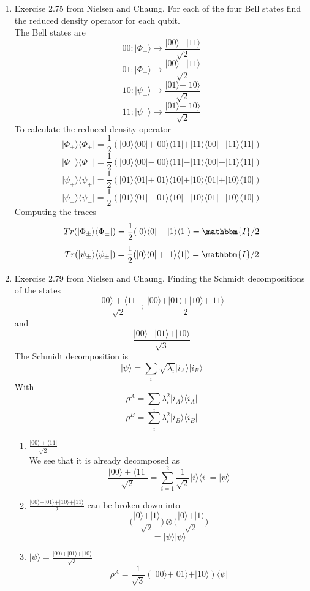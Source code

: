 \documentclass[12pt]{article}
\newcommand{\ket}[1]{\vert{#1}\rangle}
\newcommand{\bra}[1]{\langle{#1}\vert}
\begin{document}
\begin{enumerate}
\item Exercise 2.75 from Nielsen and Chaung. For each of the four Bell states find the reduced density operator for each qubit. 
\\ 
The Bell states are 
$$ 00: \ket{\Phi_+} \rightarrow \frac{\ket{00} + \ket{11}}{\sqrt{2}} $$ 
$$ 01: \ket{\Phi_-} \rightarrow \frac{\ket{00} - \ket{11}}{\sqrt{2}} $$
$$ 10: \ket{\psi_+} \rightarrow \frac{\ket{01} + \ket{10}}{\sqrt{2}} $$
$$ 11: \ket{\psi_-} \rightarrow \frac{\ket{01} - \ket{10}}{\sqrt{2}} $$ 
To calculate the reduced density operator 
$$ \ket{\Phi_+}\bra{\Phi_+} = \frac{1}{2} ( \ket{00}\bra{00} + \ket{00}\bra{11} + \ket{11}\bra{00} + \ket{11}\bra{11}) $$
$$ \ket{\Phi_-}\bra{\Phi_-} = \frac{1}{2} ( \ket{00}\bra{00} - \ket{00}\bra{11} - \ket{11}\bra{00} - \ket{11}\bra{11}) $$
$$ \ket{\psi_+}\bra{\psi_+} = \frac{1}{2} ( \ket{01}\bra{01} + \ket{01}\bra{10} + \ket{10}\bra{01} + \ket{10}\bra{10}) $$
$$ \ket{\psi_-}\bra{\psi_-} = \frac{1}{2} ( \ket{01}\bra{01} - \ket{01}\bra{10} - \ket{10}\bra{01} - \ket{10}\bra{10}) $$
Computing the traces 
$$ Tr(\ket{\Phi_{\pm}}\bra{\Phi_{\pm}}) = \frac{1}{2} (\ket{0}\bra{0} + \ket{1}\bra{1}) = \mathbbm{I} / 2 $$
$$ Tr(\ket{\psi_{\pm}}\bra{\psi_{\pm}}) = \frac{1}{2} (\ket{0}\bra{0} + \ket{1}\bra{1}) = \mathbbm{I} / 2 $$
\item Exercise 2.79 from Nielsen and Chaung. Finding the Schmidt decompositions of the states 
$$ \frac{\ket{00}+\bra{11}}{\sqrt{2}} \ ; \ \frac{\ket{00} + \ket{01} + \ket{10} + \ket{11}}{2} $$
and 
$$ \frac{\ket{00} + \ket{01} + \ket{10}}{\sqrt{3}} $$
The Schmidt decomposition is 
$$ \ket{\psi} = \sum_i \sqrt{\lambda_i} \ket{i_A} \ket{i_B} $$
With 
$$ \rho^A = \sum_i \lambda_i^2 \ket{i_A}\bra{i_A} $$
$$ \rho^B = \sum_i \lambda_i^2 \ket{i_B}\bra{i_B} $$
\begin{enumerate}
    \item $ \frac{\ket{00}+\bra{11}}{\sqrt{2}}$
    \\
    We see that it is already decomposed as 
    $$ \frac{\ket{00}+\bra{11}}{\sqrt{2}} = \sum_{i=1}^2 \frac{1}{\sqrt{2}} \ket{i}\bra{i} = \ket{\psi} $$
    \item $\frac{\ket{00} + \ket{01} + \ket{10} + \ket{11}}{2}$ can be broken down into 
    $$ \Big( \frac{\ket{0} + \ket{1}}{\sqrt{2}}\Big) \otimes \Big(\frac{\ket{0} + \ket{1}}{\sqrt{2}}\Big) $$
    $$ = \ket{\psi} \ket{\psi} $$
    \item $\ket{\psi} = \frac{\ket{00} + \ket{01} + \ket{10}}{\sqrt{3}} $
    $$ \rho^A = \frac{1}{\sqrt{3}} (\ket{00} + \ket{01} + \ket{10})\bra{\psi} $$ 

\end{enumerate}
\end{enumerate}
\end{document}
